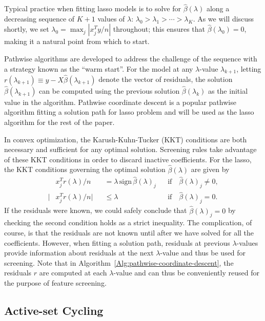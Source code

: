 \documentclass{article}
\providecommand{\sign}{\textrm{sign}}
\begin{document}
Typical practice when fitting lasso models is to solve for $\hat{\beta}(\lambda)$ along a decreasing sequence of $K+1$ values of $\lambda$: $\lambda_0 > \lambda_1 > \cdots > \lambda_K$.  As we will discuss shortly, we set $\lambda_0=\max_j|x_j^Ty/n|$ throughout; this ensures that $\hat{\beta}(\lambda_0)=0$, making it a natural point from which to start.

 Pathwise algorithms are developed to address the challenge of the sequence with a strategy known as the ``warm start''. For the model at any $\lambda$-value $\lambda_{k+1}$, letting $r(\lambda_{k+1}) \equiv y-X\hat{\beta}(\lambda_{k+1})$ denote the vector of residuals, the solution $\hat{\beta}(\lambda_{k+1})$ can be computed using the previous solution $\hat{\beta}(\lambda_k)$ as the initial value in the algorithm. Pathwise coordinate descent is a popular pathwise algorithm fitting a solution path for lasso problem and will be used as the lasso algorithm for the rest of the paper.

In convex optimization, the Karush-Kuhn-Tucker (KKT) conditions are both necessary and sufficient for any optimal solution.  Screening rules take advantage of these KKT conditions in order to discard inactive coefficients.  For the lasso, the KKT conditions governing the optimal solution $\hat{\beta}(\lambda)$ are given by
\begin{equation}
  \begin{aligned}
    &x_j^Tr(\lambda)/n& &= \lambda \, \sign \, \hat{\beta}(\lambda)_j & & \textrm{if} \quad \hat{\beta}(\lambda)_j\neq 0,\\
    |&x_j^Tr(\lambda)/n|& &\leq \lambda & & \textrm{if} \quad \hat{\beta}(\lambda)_j= 0.
  \end{aligned}
\end{equation}
If the residuals were known, we could safely conclude that $\hat{\beta}(\lambda)_j=0$ by checking the second condition holds as a strict inequality.  The complication, of course, is that the residuals are not known until after we have solved for all the coefficients.  However, when fitting a solution path, residuals at previous $\lambda$-values provide information about residuals at the next $\lambda$-value and thus be used for screening.  Note that in Algorithm~\ref{Alg:pathwise-coordinate-descent}, the residuals $r$ are computed at each $\lambda$-value and can thus be conveniently reused for the purpose of feature screening.

\subsection{Active-set Cycling}
\label{sec:active}
\end{document}
